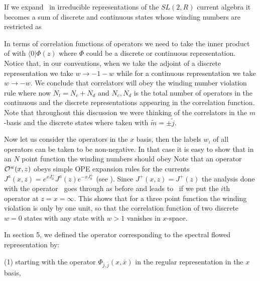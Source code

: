 If we expand \state\ in irreducible representations of the
$SL(2,R)$ current algebra it becomes a sum of
discrete and continuous states whose winding numbers are
restricted as
\eqn{}


In terms of correlation functions of operators we need to take the
inner product of \state with $\langle 0| \Phi(z)$ where $\Phi$ could
be a discrete or continuous representation. Notice that,
in our conventions, when we take the adjoint of
a discrete representation we take $w \to -1-w$ while
for a continuous representation we take $w \to -w$.
We conclude
that correlators will obey the winding number violation rule
\eqn{}
where now $N_t=N_c + N_d $ and $N_c, N_d$ is the total number of
 operators in the continuous and the discrete representations appearing
in the  correlation
function. Note that throughout this discussion we were thinking
of the correlators in the $m$-basis and the discrete states
where taken with $\tilde m=\pm \tilde j$.

Now let us consider the operators in the $x$ basis, then  the
labels $w_i$ of all operators can be taken to be non-negative.
In that case it is easy to show that in an $N$ point function
the  winding numbers  should obey
\eqn{}
Note that an operator ${\cal O}^w(x,z)$ obeys simple
OPE expansion rules for the currents $J^a(x,z) = e^{x J_0^+} J^a(z)
e^{- x J_0^+}$ (see \ks ). Since
$J^+(x,z) = J^+(z) $  the analysis
done with the operator \precise\ goes through as before and leads
to \easy\ if we put  the $i$th operator at $z=x=\infty$.
This shows that for a three point function the winding violation
is only by one unit, so that the correlation function of
two discrete $w=0$ states with any  state with $w>1$
vanishes in $x$-space.








In section 5, we defined the operator corresponding to
the spectral flowed representation by:


(1) starting with the
operator $\Phi_{j,\bar j}(x,\bar x)$ in the regular
representation in the $x$ basis,


